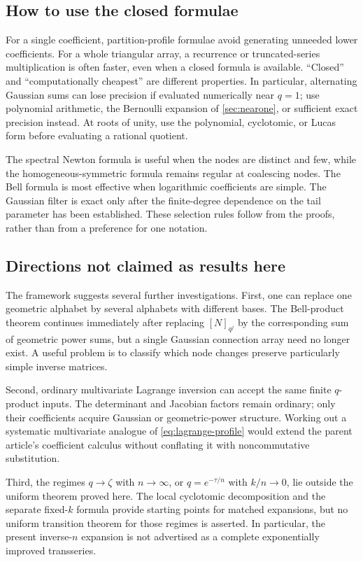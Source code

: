 \documentclass[11pt,a4paper]{article}
\numberwithin{equation}{section}
\theoremstyle{definition}
\theoremstyle{remark}
\begin{document}
\subsection{How to use the closed formulae}
For a single coefficient, partition-profile formulae avoid generating
unneeded lower coefficients. For a whole triangular array, a recurrence
or truncated-series multiplication is often faster, even when a closed
formula is available. ``Closed'' and ``computationally cheapest'' are
different properties. In particular, alternating Gaussian sums can
lose precision if evaluated numerically near $q=1$; use polynomial
arithmetic, the Bernoulli expansion of \cref{sec:nearone}, or sufficient
exact precision instead. At roots of unity, use the polynomial,
cyclotomic, or Lucas form before evaluating a rational quotient.

The spectral Newton formula is useful when the nodes are distinct and
few, while the homogeneous-symmetric formula remains regular at
coalescing nodes. The Bell formula is most effective when logarithmic
coefficients are simple. The Gaussian filter is exact only after the
finite-degree dependence on the tail parameter has been established.
These selection rules follow from the proofs, rather than from a
preference for one notation.

\subsection{Directions not claimed as results here}
The framework suggests several further investigations. First, one can
replace one geometric alphabet by several alphabets with different bases.
The Bell-product theorem continues immediately after replacing
$[N]_{q^j}$ by the corresponding sum of geometric power sums, but a
single Gaussian connection array need no longer exist. A useful problem
is to classify which node changes preserve particularly simple inverse
matrices.

Second, ordinary multivariate Lagrange inversion can accept the same
finite $q$-product inputs. The determinant and Jacobian factors remain
ordinary; only their coefficients acquire Gaussian or geometric-power
structure. Working out a systematic multivariate analogue of
\cref{eq:lagrange-profile} would extend the parent article's coefficient
calculus without conflating it with noncommutative substitution.

Third, the regimes $q\to\zeta$ with $n\to\infty$, or
$q=e^{-\tau/n}$ with $k/n\to0$, lie outside the uniform theorem proved
here. The local cyclotomic decomposition and the separate fixed-$k$
formula provide starting points for matched expansions, but no uniform
transition theorem for those regimes is asserted. In particular, the
present inverse-$n$ expansion is not advertised as a complete
exponentially improved transseries.
\end{document}
